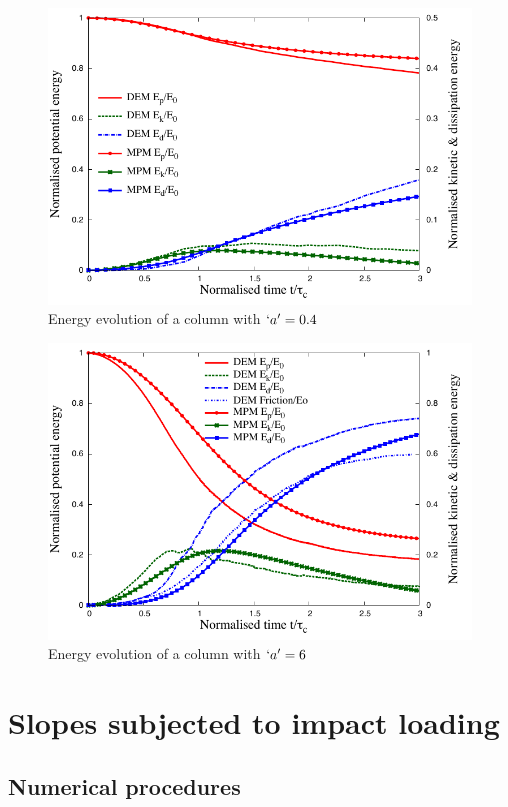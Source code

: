 \begin{figure}[tbhp]
\centering
\includegraphics[width=\textwidth]{a04_energy}
\caption{Energy evolution of a column with $`a'=0.4$}
\label{fig:a04_energy}
\end{figure}

\begin{figure}[tbhp]
\centering
\includegraphics[width=\textwidth]{a6_energy}
\caption{Energy evolution of a column with $`a'=6$}
\label{fig:a6_energy}
\end{figure}


\section{Slopes subjected to impact loading}


\subsection{Numerical procedures}
\label{sec:num}

